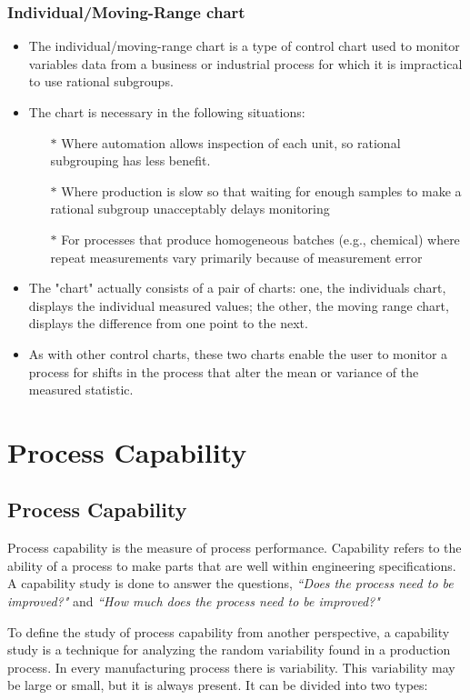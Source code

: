 \documentclass[]{report}
\begin{document}
\subsection{Individual/Moving-Range chart}
\begin{itemize}
\item The individual/moving-range chart is a type of control chart used to monitor variables data from a business or industrial process for which it is impractical to use rational subgroups.

\item The chart is necessary in the following situations:
\begin{itemize}
\item[$\ast$] Where automation allows inspection of each unit, so rational subgrouping has less benefit.
\item[$\ast$]Where production is slow so that waiting for enough samples to make a rational subgroup unacceptably delays monitoring
\item[$\ast$] For processes that produce homogeneous batches (e.g., chemical) where repeat measurements vary primarily because of measurement error
\end{itemize}
\item The "chart" actually consists of a pair of charts: one, the individuals chart, displays the individual measured values; the other, the moving range chart, displays the difference from one point to the next. 
\item As with other control charts, these two charts enable the user to monitor a process for shifts in the process that alter the mean or variance of the measured statistic.
\end{itemize}
\newpage
\chapter{Process Capability}
\section{Process Capability}
Process capability is the measure of process performance. Capability refers to the ability of a process to make parts that are well within engineering specifications. A capability study is done to answer the questions, \textit{``Does the process need to be improved?"} and  \textit{``How much does the process need to be improved?"}

To define the study of process capability from another perspective, a capability study is a technique for analyzing the random variability found in a production process. In every manufacturing process there is variability. This variability may be large or small, but it is always present. It can be divided into two types:
\end{document}
